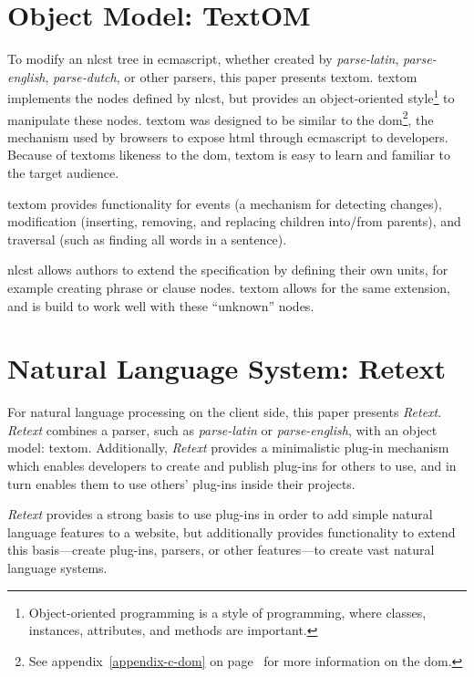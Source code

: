 \section{Object Model: TextOM}\label{object-model}

To modify an \gls{nlcst} tree in \gls{ecmascript}, whether created by
  \emph{parse-latin}, \emph{parse-english}, \emph{parse-dutch}, or other
  parsers, this paper presents \gls{textom}.
\gls{textom} implements the nodes defined by \gls{nlcst},
  but provides an object-oriented style\footnote{Object-oriented
    programming is a style of programming, where classes, instances,
    attributes, and methods are important.} to manipulate these nodes.
\gls{textom} was designed to be similar to the \gls{dom}\footnote{See
    appendix~\ref{appendix-c-dom} on page~\pageref{appendix-c-dom} for more
    information on the \gls{dom}.},
  the mechanism used by browsers to expose \gls{html} through
  \gls{ecmascript} to developers.
Because of \glspl{textom} likeness to the \gls{dom}, \gls{textom} is
  easy to learn and familiar to the target audience.

\gls{textom} provides functionality for events (a mechanism for detecting
  changes), modification (inserting, removing, and replacing children
  into\slash from parents), and traversal (such as finding all words in a
  sentence).

\gls{nlcst} allows authors to extend the specification by defining their
  own units, for example creating phrase or clause nodes.
\gls{textom} allows for the same extension, and is build to work well
  with these ``unknown'' nodes.

\section{Natural Language System:
  Retext}\label{natural-language-system-retext}

For natural language processing on the client side, this paper presents
  \emph{Retext}.
\emph{Retext} combines a parser, such as \emph{parse-latin} or
  \emph{parse-english}, with an object model: \gls{textom}.
Additionally, \emph{Retext} provides a minimalistic plug-in mechanism which
  enables developers to create and publish plug-ins for others to use, and in
  turn enables them to use others' plug-ins inside their projects.

\emph{Retext} provides a strong basis to use plug-ins in order to add simple
  natural language features to a website, but additionally provides
  functionality to extend this basis---create plug-ins, parsers, or other
  features---to create vast natural language systems.

